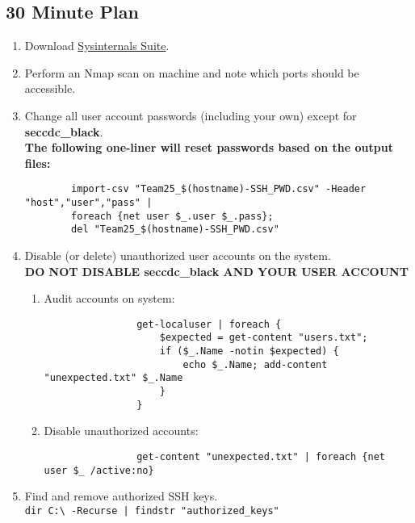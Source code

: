 \documentclass[12pt,letterpaper]{article}
\def\code#1{\textcolor{iris}{\texttt{#1}}}
\def\bf#1{\textbf{#1}}
\begin{document}
\subsection{30 Minute Plan}

\begin{enumerate}
	\item Download \href{https://download.sysinternals.com/files/SysinternalsSuite.zip}{Sysinternals Suite}.
	\item Perform an Nmap scan on machine and note which ports should be accessible.
	\item Change all user account passwords (including your own) except for \bf{seccdc\_black}. \\
		\bf{The following one-liner will reset passwords based on the output files:}
		\begin{verbatim}
		import-csv "Team25_$(hostname)-SSH_PWD.csv" -Header "host","user","pass" |
		foreach {net user $_.user $_.pass};
		del "Team25_$(hostname)-SSH_PWD.csv"
		\end{verbatim}
	\item Disable (or delete) unauthorized user accounts on the system. \\
	\bf{DO NOT DISABLE seccdc\_black AND YOUR USER ACCOUNT}
		\begin{enumerate}
			\item Audit accounts on system:
				\begin{verbatim}
				get-localuser | foreach {
					$expected = get-content "users.txt";
					if ($_.Name -notin $expected) {
						echo $_.Name; add-content "unexpected.txt" $_.Name
					}
				}
				\end{verbatim}
			\item Disable unauthorized accounts:
				\begin{verbatim}
				get-content "unexpected.txt" | foreach {net user $_ /active:no}
				\end{verbatim}
		\end{enumerate}
	\item Find and remove authorized SSH keys. \\
		\code{dir C:\textbackslash{} -Recurse | findstr "authorized\_keys"}


\end{enumerate}
\end{document}
